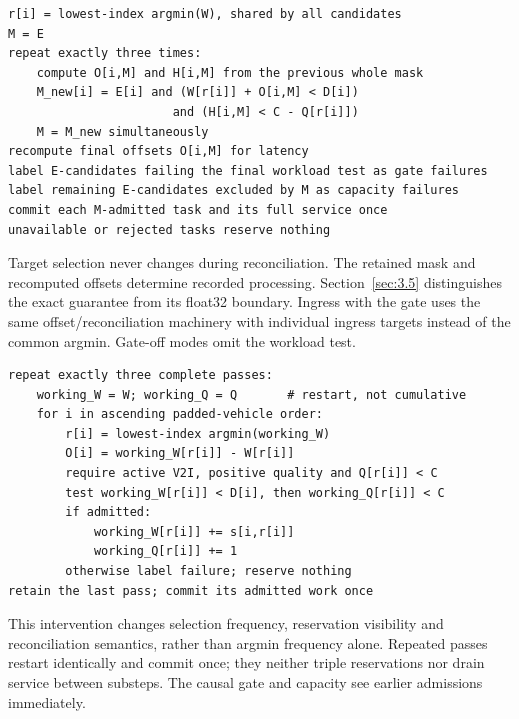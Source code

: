 \documentclass[12pt,a4paper]{article}
\begin{document}
\begin{algorithm}[htbp]
\caption{common-target placement with gate (one substep)}\label{alg:1}
\begin{Verbatim}[fontsize=\small,breaklines=true]
r[i] = lowest-index argmin(W), shared by all candidates
M = E
repeat exactly three times:
    compute O[i,M] and H[i,M] from the previous whole mask
    M_new[i] = E[i] and (W[r[i]] + O[i,M] < D[i])
                       and (H[i,M] < C - Q[r[i]])
    M = M_new simultaneously
recompute final offsets O[i,M] for latency
label E-candidates failing the final workload test as gate failures
label remaining E-candidates excluded by M as capacity failures
commit each M-admitted task and its full service once
unavailable or rejected tasks reserve nothing
\end{Verbatim}
\end{algorithm}

Target selection never changes during reconciliation. The retained mask and recomputed offsets determine recorded processing. Section~\ref{sec:3.5} distinguishes the exact guarantee from its float32 boundary. Ingress with the gate uses the same offset/reconciliation machinery with individual ingress targets instead of the common argmin. Gate-off modes omit the workload test.

\begin{algorithm}[htbp]
\caption{causal per-task placement with gate (one substep)}\label{alg:2}
\begin{Verbatim}[fontsize=\small,breaklines=true]
repeat exactly three complete passes:
    working_W = W; working_Q = Q       # restart, not cumulative
    for i in ascending padded-vehicle order:
        r[i] = lowest-index argmin(working_W)
        O[i] = working_W[r[i]] - W[r[i]]
        require active V2I, positive quality and Q[r[i]] < C
        test working_W[r[i]] < D[i], then working_Q[r[i]] < C
        if admitted:
            working_W[r[i]] += s[i,r[i]]
            working_Q[r[i]] += 1
        otherwise label failure; reserve nothing
retain the last pass; commit its admitted work once
\end{Verbatim}
\end{algorithm}

This intervention changes selection frequency, reservation visibility and reconciliation semantics, rather than argmin frequency alone. Repeated passes restart identically and commit once; they neither triple reservations nor drain service between substeps. The causal gate and capacity see earlier admissions immediately.
\end{document}
